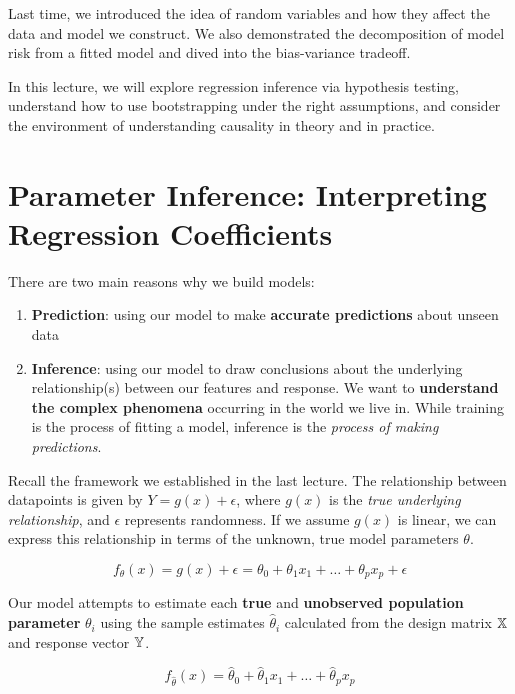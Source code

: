 \documentclass[
  letterpaper,
  DIV=11,
  numbers=noendperiod]{scrreprt}
\providecommand{\tightlist}{%
  \setlength{\itemsep}{0pt}\setlength{\parskip}{0pt}}\usepackage{longtable,booktabs,array}
\begin{document}
Last time, we introduced the idea of random variables and how they
affect the data and model we construct. We also demonstrated the
decomposition of model risk from a fitted model and dived into the
bias-variance tradeoff.

In this lecture, we will explore regression inference via hypothesis
testing, understand how to use bootstrapping under the right
assumptions, and consider the environment of understanding causality in
theory and in practice.

\section{Parameter Inference: Interpreting Regression
Coefficients}\label{parameter-inference-interpreting-regression-coefficients}

There are two main reasons why we build models:

\begin{enumerate}
\def\labelenumi{\arabic{enumi}.}
\tightlist
\item
  \textbf{Prediction}: using our model to make \textbf{accurate
  predictions} about unseen data
\item
  \textbf{Inference}: using our model to draw conclusions about the
  underlying relationship(s) between our features and response. We want
  to \textbf{understand the complex phenomena} occurring in the world we
  live in. While training is the process of fitting a model, inference
  is the \emph{process of making predictions}.
\end{enumerate}

Recall the framework we established in the last lecture. The
relationship between datapoints is given by \(Y = g(x) + \epsilon\),
where \(g(x)\) is the \emph{true underlying relationship}, and
\(\epsilon\) represents randomness. If we assume \(g(x)\) is linear, we
can express this relationship in terms of the unknown, true model
parameters \(\theta\).

\[f_{\theta}(x) = g(x) + \epsilon = \theta_0 + \theta_1 x_1 + \ldots + \theta_p x_p + \epsilon\]

Our model attempts to estimate each \textbf{true} and \textbf{unobserved
population parameter} \(\theta_i\) using the sample estimates
\(\hat{\theta}_i\) calculated from the design matrix \(\Bbb{X}\) and
response vector \(\Bbb{Y}\).

\[f_{\hat{\theta}}(x) = \hat{\theta}_0 + \hat{\theta}_1 x_1 + \ldots + \hat{\theta}_p x_p\]
\end{document}
